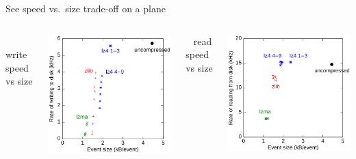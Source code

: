 \documentclass[aspectratio=169]{beamer}
\begin{document}
\begin{frame}{See speed vs.\ size trade-off on a plane}
\vspace{0.5 cm}
\begin{columns}
\mbox{ } \hfill write speed vs size \hfill \mbox{ }

\includegraphics[width=\linewidth]{write.png}

\vspace{2 cm}

\mbox{ } \hfill read speed vs size \hfill \mbox{ }

\includegraphics[width=\linewidth]{read.png}


\end{columns}
\end{frame}
\end{document}

